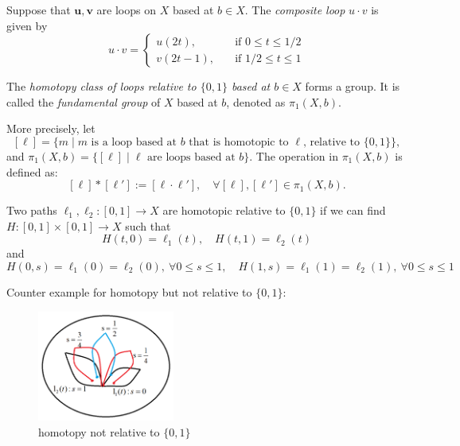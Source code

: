 \begin{definition}
Suppose that $\bm u,\bm v$ are loops on $X$ based at $b\in X$.
The \emph{composite loop} $u\cdot v$ is given by
\[
u\cdot v=\left\{
\begin{aligned}
u(2t),&\quad\text{if $0\le t\le1/2$}\\
v(2t-1),&\quad\text{if $1/2\le t\le1$}
\end{aligned}
\right.
\]
\end{definition}


\begin{definition}
The \emph{homotopy class of loops relative to $\{0,1\}$ based at $b\in X$} forms a group.
It is called the \emph{fundamental group} of $X$ based at $b$, denoted as $\pi_1(X,b)$.

More precisely, let 
\[
[\ell]=\{m\mid \text{$m$ is a loop based at $b$ that is homotopic to $\ell$, relative to $\{0,1\}$}\},
\]
and $\pi_1(X,b)=\{[\ell]\mid \text{$\ell$ are loops based at $b$}\}$.
The operation in $\pi_1(X,b)$ is defined as:
\[
[\ell]*[\ell']:=[\ell\cdot\ell'],\quad
\forall [\ell],[\ell']\in\pi_1(X,b).
\]
\end{definition}

\begin{remark}
Two paths $\ell_1,\ell_2:[0,1]\to X$ are homotopic relative to $\{0,1\}$ if we can find $H:[0,1]\times[0,1]\to X$ such that
\[
H(t,0)=\ell_1(t),\quad
H(t,1)=\ell_2(t)
\]
and
\[
H(0,s) = \ell_1(0)=\ell_2(0),\ \forall 0\le s\le1,\quad
H(1,s) = \ell_1(1)=\ell_2(1),\ \forall 0\le s\le 1
\]
\end{remark}

Counter example for homotopy but not relative to $\{0,1\}$: 
\begin{figure}[H]
	\centering
	\includegraphics[width=0.4\textwidth]{week11/nonrelative2.png}
	\caption{homotopy not relative to $\{0,1\}$}
	\label{fig: 1:10}
\end{figure}



